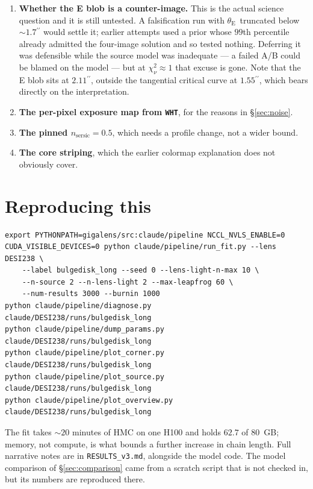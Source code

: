 \documentclass[11pt]{article}
\newcommand{\arcsec}{\ensuremath{^{\prime\prime}}}
\newcommand{\thetaE}{\ensuremath{\theta_{\mathrm{E}}}}
\newcommand{\chisqv}{\ensuremath{\chi^{2}_{\nu}}}
\begin{document}
\begin{enumerate}
  \item \textbf{Whether the E blob is a counter-image.} This is the actual science
    question and it is still untested. A falsification run with \thetaE\ truncated below
    ${\sim}1.7\arcsec$ would settle it; earlier attempts used a prior whose $99$th
    percentile already admitted the four-image solution and so tested nothing. Deferring
    it was defensible while the source model was inadequate --- a failed A/B could be
    blamed on the model --- but at $\chisqv \approx 1$ that excuse is gone. Note that the
    E blob sits at $2.11\arcsec$, outside the tangential critical curve at $1.55\arcsec$,
    which bears directly on the interpretation.
  \item \textbf{The per-pixel exposure map from \texttt{WHT}}, for the reasons in
    \S\ref{sec:noise}.
  \item \textbf{The pinned $n_{\mathrm{sersic}} = 0.5$}, which needs a profile change, not
    a wider bound.
  \item \textbf{The core striping}, which the earlier colormap explanation does not
    obviously cover.
\end{enumerate}

\section*{Reproducing this}

{\small
\begin{verbatim}
export PYTHONPATH=gigalens/src:claude/pipeline NCCL_NVLS_ENABLE=0
CUDA_VISIBLE_DEVICES=0 python claude/pipeline/run_fit.py --lens DESI238 \
    --label bulgedisk_long --seed 0 --lens-light-n-max 10 \
    --n-source 2 --n-lens-light 2 --max-leapfrog 60 \
    --num-results 3000 --burnin 1000
python claude/pipeline/diagnose.py    claude/DESI238/runs/bulgedisk_long
python claude/pipeline/dump_params.py claude/DESI238/runs/bulgedisk_long
python claude/pipeline/plot_corner.py claude/DESI238/runs/bulgedisk_long
python claude/pipeline/plot_source.py claude/DESI238/runs/bulgedisk_long
python claude/pipeline/plot_overview.py claude/DESI238/runs/bulgedisk_long
\end{verbatim}
}

\noindent
The fit takes ${\sim}20$ minutes of HMC on one H100 and holds $62.7$ of $80$~GB; memory,
not compute, is what bounds a further increase in chain length. Full narrative notes are
in \texttt{RESULTS\_v3.md}, alongside the model code. The model comparison of
\S\ref{sec:comparison} came from a scratch script that is not checked in, but its numbers
are reproduced there.
\end{document}
